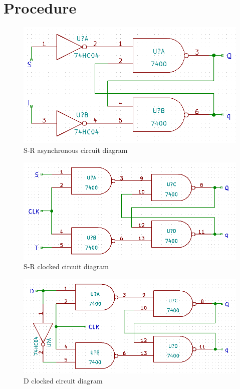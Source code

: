 \documentclass[11pt,a4paper]{article}
\begin{document}
\section{Procedure}
\begin{figure}[H]
    \centering
    \includegraphics[width=5in]{SR-async.png}
    \caption{S-R asynchronous circuit diagram}
\end{figure}
\begin{figure}[H]
    \centering
    \includegraphics[width=5in]{SR-clocked.png}
    \caption{S-R clocked circuit diagram}
\end{figure}
\begin{figure}[H]
    \centering
    \includegraphics[width=5in]{D-clocked.png}
    \caption{D clocked circuit diagram}
\end{figure}
\end{document}
